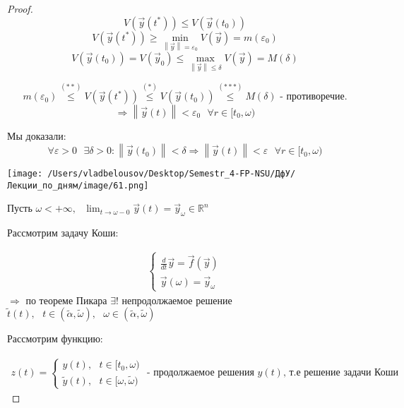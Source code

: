 \documentclass[12pt, a4paper]{report}
\begin{document}
\begin{proof}
    \[ V(\vec{y}  (t ^* )) \le  V (\vec{y}  (t_0)) \tag{\(*  \) }\] 
    \[ V(\vec{y}  (t^* )) \ge  \min _{\left\lVert \vec{y}  \right\rVert = \varepsilon_0} V (\vec{y } ) = m(\varepsilon_0 )    \tag{\(**  \) }     \] 
    \[ V(\vec{y}  (t_0 ) )= V(\vec{y} _0  ) \le  \max _{\left\lVert \vec{y}  \right\rVert \le  \delta } V(\vec{y}  ) = M(\delta )  \tag{\(*  **\) } \] 

    \[ m(\varepsilon_0 ) \overset{(**)}{\le}  V(\vec{y }  (t^*)) \overset{(*)}{\le}  V(\vec{y }  (t_0)) \overset{(***)}{\le}  M(\delta )\text{ - противоречие.}  \] 
    \[ \Rightarrow \left\lVert \vec{y } (t) \right\rVert < \varepsilon_0 \text{  }  \forall  r \in  [ t_0 , \omega) \] 

    Мы доказали: 
    \[ \forall  \varepsilon > 0 \text{ }  \exists  \delta > 0 : \left\lVert \vec{y} (t_0) \right\rVert < \delta \Rightarrow \left\lVert \vec{y}  (t) \right\rVert < \varepsilon \text{ } \forall  r \in  [t_0 , \omega) \] 

    \begin{center}
        \texttt{[image: /Users/vladbelousov/Desktop/Semestr\_4-FP-NSU/ДфУ/Лекции\_по\_дням/image/61.png]}
    \end{center}

    Пусть \( \omega < + \infty  , \text{  } \displaystyle  \lim_{t  \to \omega- 0} \vec{y } (t ) = \vec{y}  _{ \omega } \in  \mathbb{R} ^n    \) 

    Рассмотрим задачу Коши: 

    \[ \begin{aligned}
    \begin{cases}
        \displaystyle \frac{d}{dt }  \vec{y } = \vec{f }  (\vec{y }  ) \\
        \vec{y } (\omega ) = \vec{y } _{\omega} 
    \end{cases}
    \end{aligned} \] 
    \( \Rightarrow  \) по теореме Пикара \( \exists !  \) непродолжаемое решение \( \tilde{t } (t ) , \text{  }  t \in  (\tilde{\alpha } ,\tilde{ \omega }) , \text{ } \omega \in  (\tilde{ \alpha } , \tilde{ \omega})  \) 

    Рассмотрим функцию: 

    \[ \begin{aligned}
        z(t )=
     \begin{cases}
     y(t ) , \text{ }  t \in  [t_0 , \omega) \\
     \tilde{y } (t ) ,\text{ }  t \in  [\omega , \tilde{\omega})
     \end{cases}
     \text{  - продолжаемое решения }   y(t) \text{, т.е решение задачи Коши} 
    \end{aligned} \]  



\end{proof}
\end{document}
